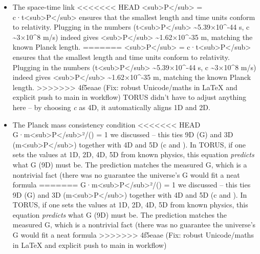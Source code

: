 \documentclass[]{article}
\begin{document}
\begin{itemize}
\item
  The space-time link
<<<<<<< HEAD
  \ell\textless sub\textgreater P\textless/sub\textgreater{} =
  c·t\textless sub\textgreater P\textless/sub\textgreater\hspace{0pt}
  ensures that the smallest length and time units conform to relativity.
  Plugging in the numbers
  (t\textless sub\textgreater P\textless/sub\textgreater{}
  \textasciitilde5.39×10\^{}-44 s, c \textasciitilde3×10\^{}8 m/s)
  indeed gives \ell\textless sub\textgreater P\textless/sub\textgreater{}
  \textasciitilde1.62×10\^{}-35 m, matching the known Planck length.
=======
  \ell\textless{}sub\textgreater{}P\textless{}/sub\textgreater{} =
  c·t\textless{}sub\textgreater{}P\textless{}/sub\textgreater{}​ ensures
  that the smallest length and time units conform to relativity.
  Plugging in the numbers
  (t\textless{}sub\textgreater{}P\textless{}/sub\textgreater{}
  \textasciitilde{}5.39×10\^{}-44 s, c \textasciitilde{}3×10\^{}8 m/s)
  indeed gives
  \ell\textless{}sub\textgreater{}P\textless{}/sub\textgreater{}
  \textasciitilde{}1.62×10\^{}-35 m, matching the known Planck length.
>>>>>>> 4f5eaae (Fix: robust Unicode/maths in LaTeX and explicit push to main in workflow)
  TORUS didn't have to adjust anything here -- by choosing \emph{c} as
  4D, it automatically aligns 1D and 2D.
\item
  The Planck mass consistency condition
<<<<<<< HEAD
  G·m\textless sub\textgreater P\textless/sub\textgreater²/(\hbarc) =
  1\hspace{0pt} we discussed -- this ties 9D (G) and 3D
  (m\textless sub\textgreater P\textless/sub\textgreater) together with
  4D and 5D (c and \hbar). In TORUS, if one sets the values at 1D, 2D, 4D,
  5D from known physics, this equation \emph{predicts} what G (9D) must
  be. The prediction matches the measured G, which is a nontrivial fact
  (there was no guarantee the universe's G would fit a neat formula
=======
  G·m\textless{}sub\textgreater{}P\textless{}/sub\textgreater{}²/(\hbarc) =
  1​ we discussed -- this ties 9D (G) and 3D
  (m\textless{}sub\textgreater{}P\textless{}/sub\textgreater{}) together
  with 4D and 5D (c and \hbar). In TORUS, if one sets the values at 1D, 2D,
  4D, 5D from known physics, this equation \emph{predicts} what G (9D)
  must be. The prediction matches the measured G, which is a nontrivial
  fact (there was no guarantee the universe's G would fit a neat formula
>>>>>>> 4f5eaae (Fix: robust Unicode/maths in LaTeX and explicit push to main in workflow)

\end{itemize}
\end{document}
